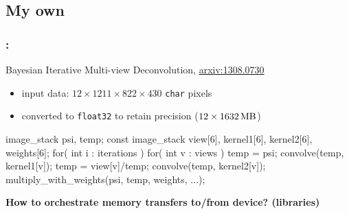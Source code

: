 \documentclass[9pt,xcolor=table]{beamer}
\begin{document}
\subsection{My own}
\begin{frame}[fragile]
\frametitle{\insertsectionhead{} : \insertsubsection}
\vspace{-1.\baselineskip}
\begin{block}{Bayesian Iterative Multi-view Deconvolution, \href{http://arxiv.org/abs/1308.0730}{arxiv:1308.0730}}
  \begin{itemize} 
  \item input data: $12\times1211\times822\times430$ \texttt{char} pixels
  \item converted to \texttt{float32} to retain precision ($12\times\unit[1632]{MB}$)
  \end{itemize}
\end{block}
\pause
\vfill
\begin{block}{}
\begin{pyglist}[language=c++,numbers=left,style=emacs]
  image_stack psi, temp;
  const image_stack view[6], kernel1[6], kernel2[6], weights[6];
  for( int i : iterations ){
    for( int v : views ){
      temp = psi;
      convolve(temp, kernel1[v]);
      temp = view[v]/temp;
      convolve(temp, kernel2[v]);
      multiply_with_weights(psi, temp, weights, ...);
    }
  }
\end{pyglist}
\end{block}
\vfill
\begin{center}\Large
  \textbf{How to orchestrate memory transfers to/from device? (libraries)}
\end{center}
\vfill
\end{frame}
\end{document}
